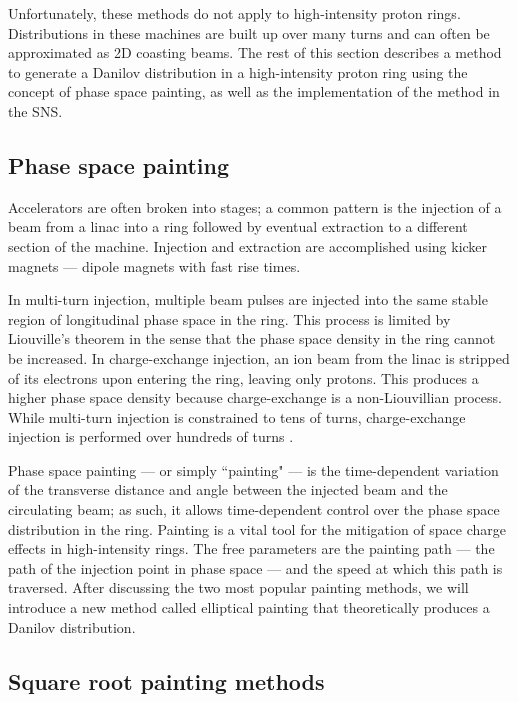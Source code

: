 Unfortunately, these methods do not apply to high-intensity proton rings. Distributions in these machines are built up over many turns and can often be approximated as 2D coasting beams. The rest of this section describes a method to generate a Danilov distribution in a high-intensity proton ring using the concept of phase space painting, as well as the implementation of the method in the SNS.


\subsection{Phase space painting}

Accelerators are often broken into stages; a common pattern is the injection of a beam from a linac into a ring followed by eventual extraction to a different section of the machine. Injection and extraction are accomplished using kicker magnets — dipole magnets with fast rise times.

In multi-turn injection, multiple beam pulses are injected into the same stable region of longitudinal phase space in the ring. This process is limited by Liouville's theorem in the sense that the phase space density in the ring cannot be increased. In charge-exchange injection, an ion beam from the linac is stripped of its electrons upon entering the ring, leaving only protons. This produces a higher phase space density because charge-exchange is a non-Liouvillian process. While multi-turn injection is constrained to tens of turns, charge-exchange injection is performed over hundreds of turns \cite{Bracco2017}.

Phase space painting — or simply ``painting" — is the time-dependent variation of the transverse distance and angle between the injected beam and the circulating beam; as such, it allows time-dependent control over the phase space distribution in the ring. Painting is a vital tool for the mitigation of space charge effects in high-intensity rings. The free parameters are the painting path — the path of the injection point in phase space — and the speed at which this path is traversed. After discussing the two most popular painting methods, we will introduce a new method called elliptical painting that theoretically produces a Danilov distribution.


\subsection{Square root painting methods}

